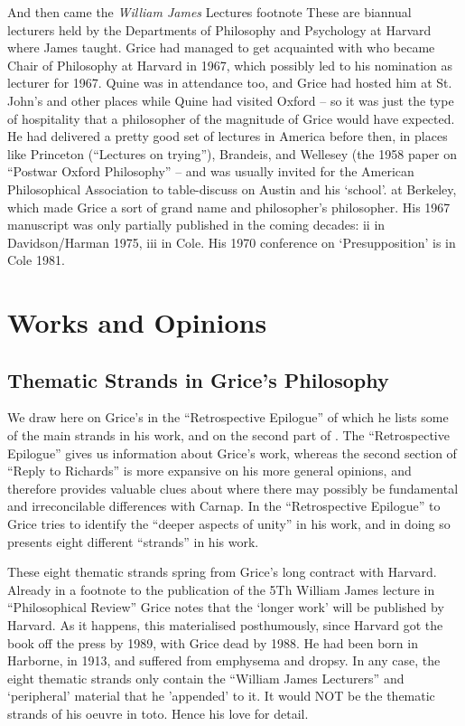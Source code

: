 \documentclass[10pt,titlepage]{book}
\begin{document}
And then came the \emph{William James} Lectures%
footnote{
These are biannual lecturers held by the Departments of Philosophy  and 
Psychology at Harvard where James taught. Grice had managed to get  acquainted 
with who became Chair of Philosophy at Harvard in 1967, which  possibly led 
to his nomination as lecturer for 1967.
Quine was in attendance too, and Grice had hosted him at St. John's and other places while Quine had visited Oxford -- so it was just the type of hospitality that a philosopher of the magnitude of Grice would have expected.
He had delivered a pretty good set of lectures in America before then, in places like Princeton (``Lectures on  
trying''), Brandeis, and Wellesey (the 1958 paper on ``Postwar Oxford Philosophy''  -- and was usually invited for the American Philosophical Association to table-discuss on Austin and his `school'.
}
at Berkeley, which made Grice a sort of grand name and philosopher's philosopher.
His 1967 manuscript was only partially published in the coming decades: ii in Davidson/Harman 1975, iii in  Cole.
His 1970 conference on `Presupposition' is in Cole 1981.

\section{Works and Opinions}

\subsection{Thematic Strands in Grice's Philosophy}

We draw here on Grice's \cite{grice89} in the ``Retrospective Epilogue'' of which he lists some of the main strands in his work, and on the second part of \cite{grice86b}.
The ``Retrospective Epilogue'' gives us information about Grice's work, whereas the second section of ``Reply to Richards'' is more expansive on his more general opinions, and therefore provides valuable clues about where there may possibly be fundamental and irreconcilable differences with Carnap.
In the ``Retrospective Epilogue'' to \cite{grice88} Grice tries to identify the ``deeper aspects of unity'' in his work, and in doing so presents eight different ``strands'' in his work.

These eight thematic strands spring from Grice's long contract with Harvard.
Already in a footnote to the publication of the 5Th William James lecture in ``Philosophical Review'' Grice notes that the `longer work' will be published by Harvard.
As it happens, this materialised posthumously, since Harvard got the book off the press by 1989, with Grice dead by 1988.
He had been born in Harborne, in 1913, and suffered from emphysema and dropsy.
In any case, the eight thematic strands only contain the ``William James Lecturers'' and `peripheral' material that he 'appended' to it.
It would NOT be the thematic strands of his oeuvre in toto.
Hence his love for detail.
\end{document}
